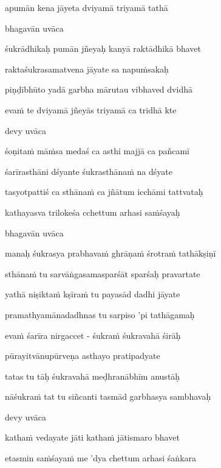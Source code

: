 apumān kena jāyeta dviyamā triyamā tathā \veg\dontdisplaylinenum

bhagavān uvāca~{\dandab}\dontdisplaylinenum 

śukrādhikaḥ pumān jñeyaḥ kanyā raktādhikā bhavet\thinspace{\danda} \dontdisplaylinenum

raktaśukrasamatvena jāyate sa napuṁsakaḥ \veg\dontdisplaylinenum

piṇḍībhūto yadā garbha mārutau vibhaved dvidhā\thinspace{\dandab} \dontdisplaylinenum

evaṁ te dviyamā jñeyās triyamā ca tridhā kte \veg\dontdisplaylinenum

devy uvāca~{\dandab}\dontdisplaylinenum 

śoṇitaṁ māṁsa medaś ca asthi majjā ca pañcamī\thinspace{\danda} \dontdisplaylinenum

śarīrasthāni dśyante śukrasthānaṁ na dśyate \veg\dontdisplaylinenum

tasyotpattiś ca sthānaṁ ca jñātum icchāmi tattvataḥ\thinspace{\dandab} \dontdisplaylinenum

kathayasva trilokeśa cchettum arhasi saṁśayaḥ \veg\dontdisplaylinenum

bhagavān uvāca~{\dandab}\dontdisplaylinenum 

manaḥ śukrasya prabhavaṁ ghrāṇaṁ śrotraṁ tathākṣiṇī\thinspace{\danda} \dontdisplaylinenum

sthānaṁ tu sarvāṅgasamasparśāt sparśaḥ pravartate \veg\dontdisplaylinenum

yathā niṣiktaṁ kṣīraṁ tu payasād dadhi jāyate\thinspace{\dandab} \dontdisplaylinenum

pramathyamānadadhnas tu sarpiso 'pi tathāgamaḥ \veg\dontdisplaylinenum

evaṁ śarīra nirgaccet - śukraṁ śukravahā śirāḥ\thinspace{\dandab} \dontdisplaylinenum

pūrayitvānupūrveṇa asthayo pratipadyate \veg\dontdisplaylinenum

tatas tu tāḥ śukravahā meḍhranābhīm anustāḥ\thinspace{\dandab} \dontdisplaylinenum

nāśukraṁ tat tu siñcanti tasmād garbhasya sambhavaḥ \veg\dontdisplaylinenum

devy uvāca~{\dandab}\dontdisplaylinenum 

kathaṁ vedayate jāti kathaṁ jātismaro bhavet\thinspace{\danda} \dontdisplaylinenum

etasmin saṁśayaṁ me 'dya chettum arhasi śaṅkara \veg\dontdisplaylinenum

